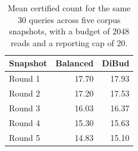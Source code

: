 \begin{table}[t]
\centering
\caption{Mean certified count for the same 30 queries across five corpus snapshots, with a budget of 2048 reads and a reporting cap of 20.}
\label{tab:temporal}
\begin{tabular}{lrr}
\toprule
Snapshot & Balanced & DiBud \\
\midrule
Round 1 & 17.70 & 17.93 \\
Round 2 & 17.20 & 17.53 \\
Round 3 & 16.03 & 16.37 \\
Round 4 & 15.30 & 15.63 \\
Round 5 & 14.83 & 15.10 \\
\bottomrule
\end{tabular}
\end{table}

